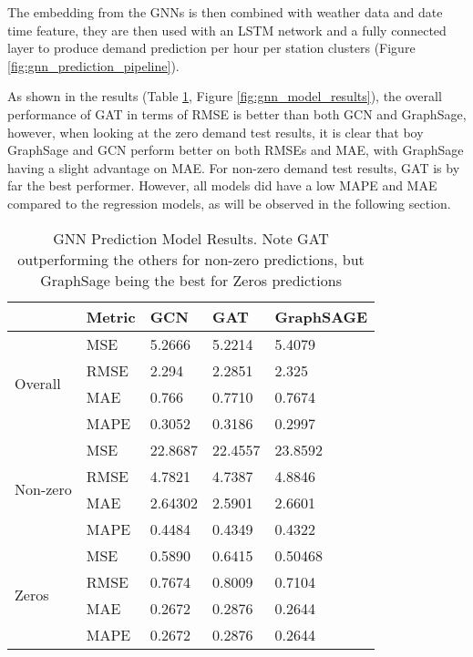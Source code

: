 \documentclass{article}
\begin{document}
The embedding from the GNNs is then combined with weather data and date time feature, they are then used with an LSTM network and a fully connected layer to produce demand prediction per hour per station clusters (Figure \ref{fig:gnn_prediction_pipeline}).

As shown in the results (Table \ref{t:gnn_model_results}, Figure \ref{fig:gnn_model_results}), the overall performance of GAT in terms of RMSE is better than both GCN and GraphSage, however, when looking at the zero demand test results, it is clear that boy GraphSage and GCN perform better on both RMSEs and MAE, with GraphSage having a slight advantage on MAE. For non-zero demand test results, GAT is by far the best performer. However, all models did have a low MAPE and MAE compared to the regression models, as will be observed in the following section.

\begin{table}[]
\begin{tabular}{||l|l|l|l|l||}
\hline
& Metric & GCN & GAT & GraphSAGE \\ \hline
\multirow{4}{*}{Overall}  
& MSE  & 5.2666  & 5.2214  & 5.4079   \\ \cline{2-5} 
& RMSE & 2.294   & 2.2851  & 2.325   \\ \cline{2-5} 
& MAE  & 0.766   & 0.7710  & 0.7674  \\ \cline{2-5} 
& MAPE & 0.3052  & 0.3186  & 0.2997  \\ \hline\hline
\multirow{4}{*}{Non-zero} 
& MSE  & 22.8687 & 22.4557 & 23.8592   \\ \cline{2-5} 
& RMSE  & 4.7821  & 4.7387  & 4.8846  \\ \cline{2-5} 
& MAE   & 2.64302 & 2.5901  & 2.6601  \\ \cline{2-5} 
& MAPE  & 0.4484  & 0.4349  & 0.4322  \\ \hline\hline
\multirow{4}{*}{Zeros}
& MSE   & 0.5890  & 0.6415  & 0.50468   \\ \cline{2-5} 
& RMSE  & 0.7674  & 0.8009  & 0.7104    \\ \cline{2-5} 
& MAE   & 0.2672  & 0.2876  & 0.2644    \\ \cline{2-5} 
& MAPE  & 0.2672  & 0.2876  & 0.2644    \\ \hline
\end{tabular}
\caption{GNN Prediction Model Results. Note GAT outperforming the others for non-zero predictions, but GraphSage being the best for Zeros predictions}
\label{t:gnn_model_results}
\end{table}
\end{document}

